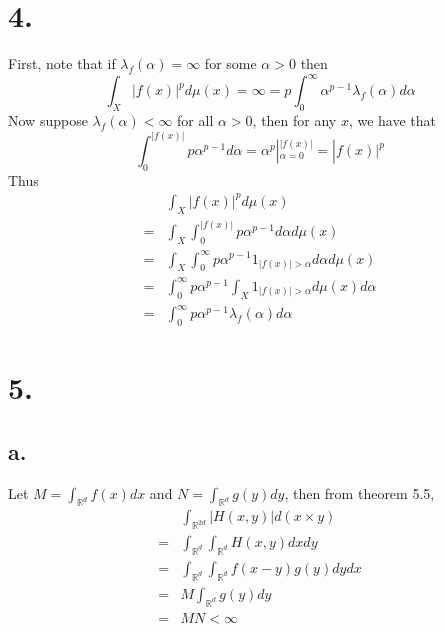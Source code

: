 \documentclass[11pt]{article}
\theoremstyle{mystyle}
\theoremstyle{definition}
\begin{document}
\section*{4.}
First, note that if $\lambda_f(\alpha) = \infty$ for some $\alpha > 0$ then 
\[
  \int_X |f(x)|^p d\mu(x) = \infty = p \int_0^\infty \alpha^{p-1} \lambda_f(\alpha) d\alpha
\]
Now suppose $\lambda_f(\alpha) < \infty$ for all $\alpha > 0$, then for any $x$, we have that 
\[
  \int_0^{|f(x)|} p\alpha^{p-1} d\alpha = \alpha^p |_{\alpha = 0}^{|f(x)|} = |f(x)|^p
\]
Thus 
\begin{align*}
  &\int_X |f(x)|^p d\mu(x) \\
  =& \int_X \int_0^{|f(x)|} p \alpha^{p-1} d\alpha d\mu(x) \\
  =& \int_X \int_0^\infty p\alpha^{p-1} 1_{|f(x)| > \alpha} d\alpha d\mu(x) \\
  =& \int_0^\infty p\alpha^{p-1} \int_X 1_{|f(x)| > \alpha} d\mu(x)d\alpha \\
  =& \int_0^\infty p \alpha^{p-1} \lambda_f(\alpha) d\alpha
\end{align*}
\newpage
\section*{5.}
\subsection*{a.}
Let $M = \int_{\mathbb{R}^d} f(x) dx$ and $N = \int_{\mathbb{R}^d} g(y) dy$, then from theorem 5.5,  
\begin{align*} 
  &\int_{\mathbb{R}^{2d}} |H(x,y)| d(x\times y) \\
  =& \int_{\mathbb{R}^d} \int_{\mathbb{R}^d} H(x,y) dx dy \\
  =& \int_{\mathbb{R}^d} \int_{\mathbb{R}^d} f(x-y)g(y) dy dx \\
  =& M \int_{\mathbb{R}^d} g(y) dy \\ 
  =& MN < \infty
\end{align*}
\end{document}
